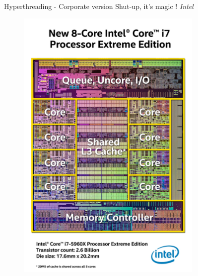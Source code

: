 \begin{frame}{Hyperthreading - Corporate version}
    Shut-up, it's magic ! \emph{Intel}
    \begin{figure}
        \centering
        \includegraphics[width=0.8\textwidth]{png/die.png}
    \end{figure}
\end{frame}


